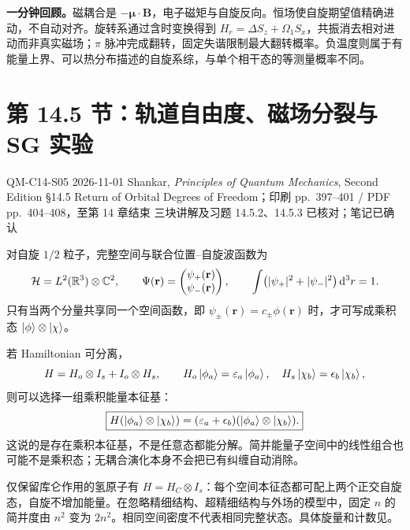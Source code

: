 \textbf{一分钟回顾。}磁耦合是 $-\boldsymbol\mu\cdot\mathbf B$，电子磁矩与自旋反向。恒场使自旋期望值精确进动，不自动对齐。旋转系通过含时变换得到 $H_r=\Delta S_z+\Omega_1S_x$，共振消去相对进动而非真实磁场；$\pi$ 脉冲完成翻转，固定失谐限制最大翻转概率。负温度则属于有能量上界、可以热分布描述的自旋系综，与单个相干态的等测量概率不同。

\section{第 14.5 节：轨道自由度、磁场分裂与 SG 实验}
\label{section:QM-C14-S05}
\studymeta
  {QM-C14-S05}
  {2026-11-01}
  {Shankar, \textit{Principles of Quantum Mechanics}, Second Edition}
  {\S 14.5 Return of Orbital Degrees of Freedom；印刷 pp.~397--401 / PDF pp.~404--408，至第 14 章结束}
  {三块讲解及习题 14.5.2、14.5.3 已核对；笔记已确认}


对自旋 $1/2$ 粒子，完整空间与联合位置--自旋波函数为
\begin{equation}
  \mathcal H=L^2(\mathbb{R}^3)\otimes\mathbb{C}^2,\qquad
  \Psi(\mathbf r)=\begin{pmatrix}\psi_+(\mathbf r)\\\psi_-(\mathbf r)\end{pmatrix},
  \qquad \int\bigl(|\psi_+|^2+|\psi_-|^2\bigr)\mathop{}\!\mathrm{d}^3r=1.
\end{equation}
只有当两个分量共享同一个空间函数，即 $\psi_\pm(\mathbf r)=c_\pm\phi(\mathbf r)$ 时，才可写成乘积态 $\left|\phi\right\rangle\otimes\left|\chi\right\rangle$。

若 Hamiltonian 可分离，
\begin{equation}
  H=H_o\otimes I_s+I_o\otimes H_s,
  \qquad H_o\left|\phi_a\right\rangle=\varepsilon_a\left|\phi_a\right\rangle,\quad
  H_s\left|\chi_b\right\rangle=\epsilon_b\left|\chi_b\right\rangle,
\end{equation}
则可以选择一组乘积能量本征基：
\begin{equation}
  \boxed{H(\left|\phi_a\right\rangle\otimes\left|\chi_b\right\rangle)
    =(\varepsilon_a+\epsilon_b)(\left|\phi_a\right\rangle\otimes\left|\chi_b\right\rangle).}
\end{equation}
这说的是存在乘积本征基，不是任意态都能分解。简并能量子空间中的线性组合也可能不是乘积态；无耦合演化本身不会把已有纠缠自动消除。

仅保留库仑作用的氢原子有 $H=H_C\otimes I_s$：每个空间本征态都可配上两个正交自旋态，自旋不增加能量。在忽略精细结构、超精细结构与外场的模型中，固定 $n$ 的简并度由 $n^2$ 变为 $2n^2$。相同空间密度不代表相同完整状态。具体旋量和计数见。

